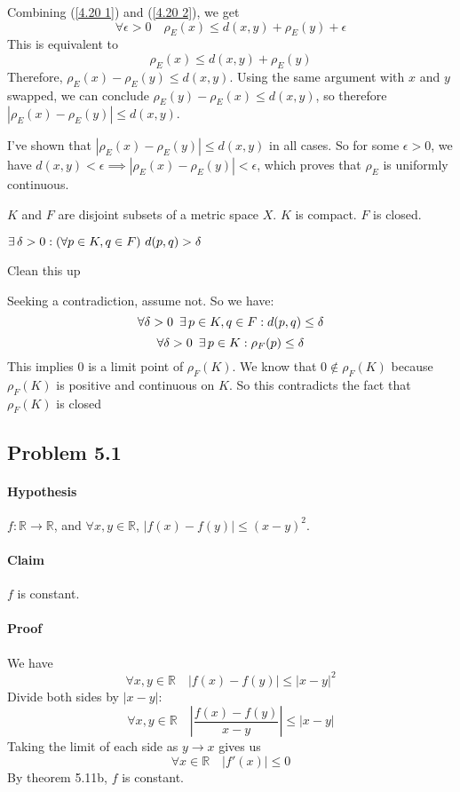 \documentclass[11pt,letterpaper]{article}
\begin{document}
Combining (\ref{4.20 1}) and (\ref{4.20 2}), we get 
\[ \forall\epsilon>0 \quad \rho_E(x) \leq d(x,y) + \rho_E(y) + \epsilon \] 
This is equivalent to
\[ \rho_E(x) \leq d(x,y) + \rho_E(y) \]
Therefore, $\rho_E(x) - \rho_E(y) \leq d(x,y)$. Using the same argument with $x$ and $y$ swapped, we can conclude $\rho_E(y) - \rho_E(x) \leq d(x,y)$, so therefore $|\rho_E(x) - \rho_E(y)| \leq d(x,y)$.

I've shown that $|\rho_E(x) - \rho_E(y)| \leq d(x,y)$ in all cases. So for some $\epsilon>0$, we have $d(x,y) < \epsilon \implies |\rho_E(x) - \rho_E(y)| < \epsilon$, which proves that $\rho_E$ is uniformly continuous. 

\begin{Problem}{4.21}
\begin{Hypothesis} $K$ and $F$ are disjoint subsets of a metric space $X$. $K$ is compact. $F$ is closed. \end{Hypothesis}
\begin{Claim} $\exists\, \delta>0 :\left( \forall p\in K,q\in F \right) \,d(p,q)>\delta$ \end{Claim}
\begin{Proof}
\begin{Todo}
Clean this up
\end{Todo}
Seeking a contradiction, assume not. So we have:
\[ \forall \delta>0 \,\,\,\exists\, p \in K,q \in F :d(p,q)\leq\delta \]
\[ \forall \delta>0 \,\,\,\exists\, p \in K :\rho_F(p)\leq\delta \]
This implies 0 is a limit point of $\rho_F(K)$. We know that $0 \notin \rho_F(K)$ because $\rho_F(K)$ is positive and continuous on $K$.
So this contradicts the fact that $\rho_F(K)$ is closed 
\end{Proof}
\end{Problem}

\subsection*{Problem 5.1}
\paragraph{Hypothesis} $f: \mathbb{R} \rightarrow \mathbb{R}$, and $\forall x,y \in \mathbb{R},\, |f(x)-f(y)| \leq (x-y)^2$.
\paragraph{Claim} $f$ is constant. 
\paragraph{Proof} We have 
\[ \forall x,y \in \mathbb{R} \quad |f(x)-f(y)| \leq |x-y|^2 \]
Divide both sides by $|x-y|$:
\[  \forall x,y \in \mathbb{R} \quad \left|\frac{f(x)-f(y)}{x-y}\right| \leq |x-y| \]
Taking the limit of each side as $y \rightarrow x$ gives us
\[  \forall x \in \mathbb{R} \quad |f'(x)| \leq 0 \]
By theorem 5.11b, $f$ is constant. 
\end{document}
